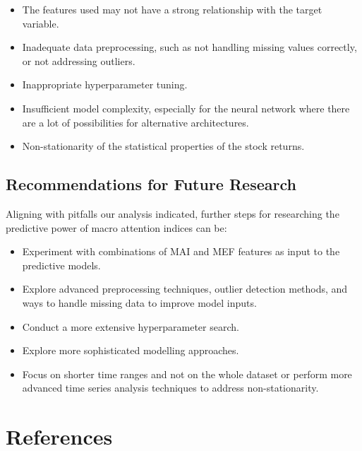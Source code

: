 \documentclass{article}
\begin{document}
\begin{itemize}
    \item The features used may not have a strong relationship with the target variable.
    \item  Inadequate data preprocessing, such as not handling missing values correctly, or not addressing outliers.
    \item Inappropriate hyperparameter tuning.
    \item Insufficient model complexity, especially for the neural network where there are a lot of possibilities for alternative architectures.
    \item Non-stationarity of the statistical properties of the stock returns.
\end{itemize}

\subsection{Recommendations for Future Research}

Aligning with pitfalls our analysis indicated, further steps for researching the predictive power of macro attention indices can be:
\begin{itemize}
    \item Experiment with combinations of MAI and MEF features as input to the predictive models.
    \item Explore advanced preprocessing techniques, outlier detection methods, and ways to handle missing data to improve model inputs.
    \item Conduct a more extensive hyperparameter search.
    \item Explore more sophisticated modelling approaches.
    \item Focus on shorter time ranges and not on the whole dataset or perform more advanced time series analysis techniques to address non-stationarity.
\end{itemize}

\section{References}

\end{document}
